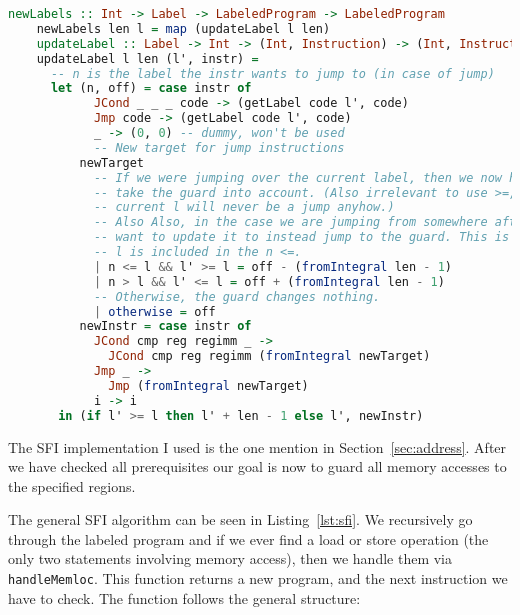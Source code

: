 \begin{lstlisting}[language={haskell}, caption={SFI algorithm}, label={lst:sfi}]
    newLabels :: Int -> Label -> LabeledProgram -> LabeledProgram
    newLabels len l = map (updateLabel l len)
    updateLabel :: Label -> Int -> (Int, Instruction) -> (Int, Instruction)
    updateLabel l len (l', instr) =
      -- n is the label the instr wants to jump to (in case of jump)
      let (n, off) = case instr of
            JCond _ _ _ code -> (getLabel code l', code)
            Jmp code -> (getLabel code l', code)
            _ -> (0, 0) -- dummy, won't be used
            -- New target for jump instructions
          newTarget
            -- If we were jumping over the current label, then we now have to
            -- take the guard into account. (Also irrelevant to use >=, as the
            -- current l will never be a jump anyhow.)
            -- Also Also, in the case we are jumping from somewhere after, we
            -- want to update it to instead jump to the guard. This is why n ==
            -- l is included in the n <=.
            | n <= l && l' >= l = off - (fromIntegral len - 1)
            | n > l && l' <= l = off + (fromIntegral len - 1)
            -- Otherwise, the guard changes nothing.
            | otherwise = off
          newInstr = case instr of
            JCond cmp reg regimm _ ->
              JCond cmp reg regimm (fromIntegral newTarget)
            Jmp _ ->
              Jmp (fromIntegral newTarget)
            i -> i
       in (if l' >= l then l' + len - 1 else l', newInstr)
\end{lstlisting}
The SFI implementation I used is the one mention in Section~\ref{sec:address}.
After we have checked all prerequisites our goal is now to guard all memory
accesses to the specified regions.

The general SFI algorithm can be seen in Listing~\ref{lst:sfi}. We recursively
go through the labeled program and if we ever find a load or store operation
(the only two statements involving memory access), then we handle them via
\texttt{handleMemloc}. This function returns a new program, and the next
instruction we have to check. The function follows the general structure:

